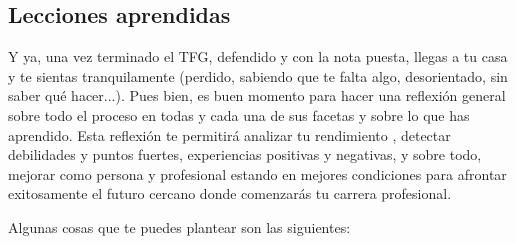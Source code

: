 \subsection{Lecciones aprendidas}

Y ya, una vez terminado el TFG, defendido y con la nota puesta, llegas a tu casa y te sientas tranquilamente (perdido, sabiendo que te falta algo, desorientado, sin saber qué hacer...). Pues bien, es buen momento para hacer una reflexión general sobre todo el proceso en todas y cada una de sus facetas y sobre lo que has aprendido. Esta reflexión te permitirá analizar tu rendimiento , detectar debilidades y puntos fuertes, experiencias positivas y negativas, y sobre todo, mejorar como persona y profesional estando en mejores condiciones para afrontar exitosamente el futuro cercano donde comenzarás tu carrera profesional.

Algunas cosas que te puedes plantear son las siguientes:

